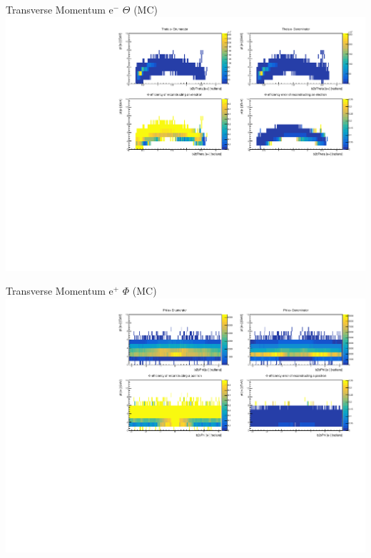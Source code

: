 \documentclass[10pt]{beamer}
\begin{document}
\begin{frame}{Transverse Momentum $\textrm{e}^-$ $\Theta$ (MC)}
	\centering
	\includegraphics[width=\textwidth]{Momentum/tMThetaem_MC}
\end{frame}

\begin{frame}{Transverse Momentum $\textrm{e}^+$ $\Phi$ (MC)}
	\centering
	\includegraphics[width=\textwidth]{Momentum/tMPhiep_MC}
\end{frame}
\end{document}

